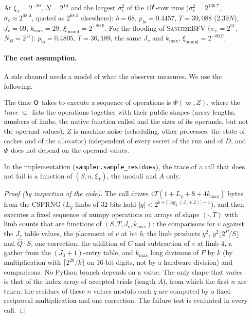 At $\xi_T=2^{-80}$, $N=2^{14}$ and the largest $\sigma_c^2$ of the $10^6$-row runs ($\sigma_c^2=2^{136.7}$, $\sigma_c\approx2^{68.4}$, quoted as $2^{68.5}$ elsewhere): $b=68$, $p_{\mathrm{lo}}=0.4457$, $T=39{,}088$ ($2.39N$), $J_v=69$, $k_{\max}=29$, $\xi_{\mathrm{bound}}=2^{-80.9}$. For the flooding of \textsc{SanitizeBFV} ($\sigma_\psi=2^{61}$, $N_B=2^{14}$): $p_{\mathrm{lo}}=0.4805$, $T=36{,}189$, the same $J_v$ and $k_{\max}$, $\xi_{\mathrm{bound}}=2^{-80.9}$.

\paragraph{The cost assumption.} A side channel needs a model of what the observer measures. We use the following.

\begin{assumption}\label{as:W}
The time $\mathsf{O}$ takes to execute a sequence of operations is $\Phi(\varpi,Z)$, where the \emph{trace} $\varpi$ lists the operations together with their public shapes (array lengths, numbers of limbs, the native function called and the sizes of its operands, but not the operand values), $Z$ is machine noise (scheduling, other processes, the state of caches and of the allocator) independent of every secret of the run and of $D$, and $\Phi$ does not depend on the operand values.
\end{assumption}

\begin{lemma}\label{lem:sampletrace}
In the implementation (\texttt{sampler.sample\_residues}), the trace of a call that does not fail is a function of $(S,n,\xi_T)$, the moduli and $A$ only.
\end{lemma}
\begin{proof}[Proof (by inspection of the code)]
The call draws $4T(1+L_y+8+4k_{\max})$ bytes from the CSPRNG ($L_y$ limbs of $32$ bits hold $|y|<2^{b+\lceil\log_2(J_v+2)\rceil+1}$), and then executes a fixed sequence of numpy operations on arrays of shape $(\cdot,T)$ with limb counts that are functions of $(S,T,J_v,k_{\max})$: the comparisons for $v$ against the $J_v$ table values, the placement of $v$ at bit $b$, the limb products $y^2$, $y^2\lfloor2^{P}/S\rfloor$ and $\hat Q\cdot S$, one correction, the addition of $C$ and subtraction of $v$ at limb $4$, a gather from the $(J_0+1)$-entry table, and $k_{\max}$ long divisions of $F$ by $k$ (by multiplication with $\lceil2^{28}/k\rceil$ on 16-bit digits, not by a hardware division) and comparisons. No Python branch depends on a value. The only shape that varies is that of the index array of accepted trials (length $A$), from which the first $n$ are taken; the residues of these $n$ values modulo each $q$ are computed by a fixed reciprocal multiplication and one correction. The failure test is evaluated in every call.
\end{proof}

